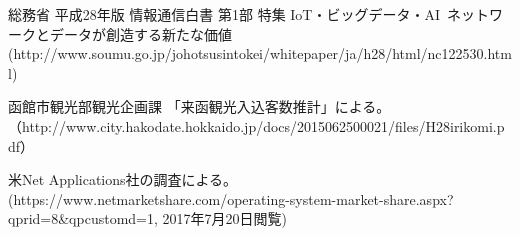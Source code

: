 \documentclass[11pt,papersize]{jsbook}
\begin{document}

\begin{thebibliography}{9}
総務省 平成28年版 情報通信白書 第1部 特集 IoT・ビッグデータ・AI~ネットワークとデータが創造する新たな価値~
 (http://www.soumu.go.jp/johotsusintokei/whitepaper/ja/h28/html/nc122530.html)

函館市観光部観光企画課 「来函観光入込客数推計」による。
（http://www.city.hakodate.hokkaido.jp/docs/2015062500021/files/H28irikomi.pdf）

米Net Applications社の調査による。
(https://www.netmarketshare.com/operating-system-market-share.aspx?qprid=8\&qpcustomd=1, 2017年7月20日閲覧)
\end{thebibliography}
\end{document}

